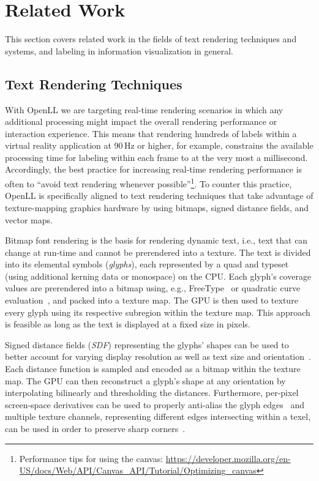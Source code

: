 
\section{Related Work}
\label{sec:related}
\noindent
This section covers related work in the fields of text rendering techniques and systems, and labeling in information visualization in general. 

\subsection{Text Rendering Techniques}
\noindent
With OpenLL we are targeting real-time rendering scenarios in which any additional processing might impact the overall rendering performance or interaction experience.
This means that rendering hundreds of labels within a virtual reality application at 90\,Hz or higher, for example, constrains the available processing time for labeling within each frame to at the very most a millisecond. 
Accordingly, the best practice for increasing real-time rendering performance is often to \enquote{avoid text rendering whenever possible}\footnote{Performance tips for using the canvas: \url{https://developer.mozilla.org/en-US/docs/Web/API/Canvas_API/Tutorial/Optimizing_canvas}}.
To counter this practice, OpenLL is specifically aligned to text rendering techniques that take advantage of texture-mapping graphics hardware by using bitmaps, signed distance fields, and vector maps.

Bitmap font
    rendering is the basis for rendering dynamic text, i.e., text that can change at run-time and cannot be prerendered into a texture. 
    The text is divided into its elemental symbols (\emph{glyphs}), each represented by a quad and typeset (using additional kerning data or monospace) on the CPU.
    Each glyph's coverage values are prerendered into a bitmap using, e.g., FreeType~\cite{freetype1996} or quadratic curve evaluation~\cite{Wallace2016}, and packed into a texture map.
    The GPU is then used to texture every glyph using its respective subregion within the texture map.
    This approach is feasible as long as the text is displayed at a fixed size in pixels.

Signed distance fields (\emph{SDF})
    representing the glyphs' shapes can be used to better account for varying display resolution as well as text size and orientation~\cite{Frisken2000}.
    Each distance function is sampled and encoded as a bitmap within the texture map.
    The GPU can then reconstruct a glyph's shape at any orientation by interpolating bilinearly and thresholding the distances.
    Furthermore, per-pixel screen-space derivatives can be used to properly anti-alias the glyph edges~\cite{Qin2006} and multiple texture channels, representing different edges intersecting within a texel, can be used in order to preserve sharp corners~\cite{Green2007}.

